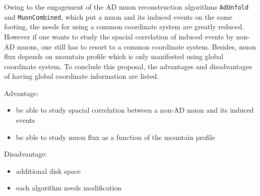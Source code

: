 \documentclass[letterpaper, 11pt]{scrartcl} %
\numberwithin{equation}{section} %
\numberwithin{figure}{section} %
\numberwithin{table}{section} %
\begin{document}
Owing to the engagement of the AD muon reconstruction algorithms \texttt{\footnotesize{AdUnfold}} and \texttt{\footnotesize{MuonCombined}}, which put a muon and its induced events on the same footing, the needs for using a common coordinate system are greatly reduced. However if one wants to study the spacial correlation of induced events by non-AD muons, one still has to resort to a common coordinate system. Besides, muon flux depends on mountain profile which is only manifested using global coordinate system. To conclude this proposal, the advantages and disadvantages of having global coordinate information are listed.\newline

Advantage:
\begin{itemize}
	\item be able to study spacial correlation between a non-AD muon and its induced events
	\item be able to study muon flux as a function of the mountain profile
\end{itemize}

Disadvantage:
\begin{itemize}
	\item additional disk space
	\item each algorithm needs modification
\end{itemize}




\end{document}
